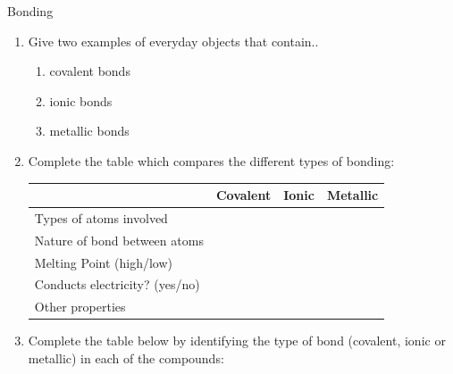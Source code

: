            \begin{exercises}{Bonding
        }
            \nopagebreak
        \label{m38694*id143111}\begin{enumerate}[noitemsep, label=\textbf{\arabic*}. ] 
            \label{m38694*uid86}\item Give two examples of everyday objects that contain..
\label{m38694*id143127}\begin{enumerate}[noitemsep, label=\textbf{\alph*}. ] 
            \label{m38694*uid87}\item covalent bonds
\label{m38694*uid88}\item ionic bonds
\label{m38694*uid89}\item metallic bonds
\end{enumerate}
                \label{m38694*uid90}\item Complete the table which compares the different types of bonding:
          \begin{table}[H]
        \begin{center}
      \label{m38694*id143180}
    \noindent
      \begin{tabular}{|l|l|l|l|}\hline
         &
        \textbf{Covalent} &
        \textbf{Ionic} &
        \textbf{Metallic} \\ \hline
        Types of atoms involved &
         &
         &
        \\ \hline
        Nature of bond between atoms &
         &
         &
       \\ \hline
        Melting Point (high/low) &
         &
         &
       \\ \hline
        Conducts electricity? (yes/no) &
         &
         &
      \\ \hline
        Other properties &
         &
         &
       \\ \hline
    \end{tabular}
      \end{center}
\end{table}
    \par
          \label{m38694*uid91}\item Complete the table below by identifying the type of bond (covalent, ionic or metallic) in each of the compounds:
          \begin{table}[H]

\end{table}
\end{enumerate}
\end{exercises}
